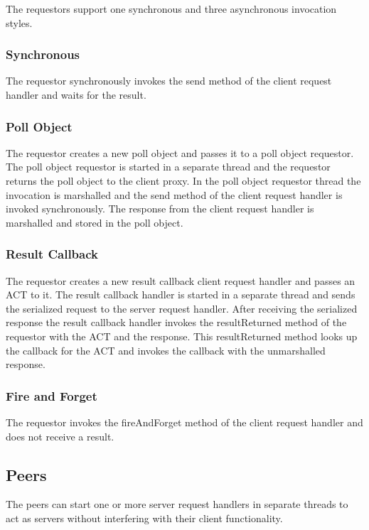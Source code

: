 The requestors support one synchronous and three asynchronous invocation styles.

\subsubsection{Synchronous}

The requestor synchronously invokes the send method of the client request handler and waits for the result.

\subsubsection{Poll Object}

The requestor creates a new poll object and passes it to a poll object requestor.
The poll object requestor is started in a separate thread and the requestor returns the poll object to the client proxy.
In the poll object requestor thread the invocation is marshalled and the send method of the client request handler is invoked synchronously.
The response from the client request handler is marshalled and stored in the poll object.

\subsubsection{Result Callback}

The requestor creates a new result callback client request handler and passes an ACT to it.
The result callback handler is started in a separate thread and sends the serialized request to the server request handler.
After receiving the serialized response the result callback handler invokes the resultReturned method of the requestor with the ACT and the response.
This resultReturned method looks up the callback for the ACT and invokes the callback with the unmarshalled response.

\subsubsection{Fire and Forget}

The requestor invokes the fireAndForget method of the client request handler and does not receive a result.

\subsection{Peers}

The peers can start one or more server request handlers in separate threads to act as servers without interfering with their client functionality.